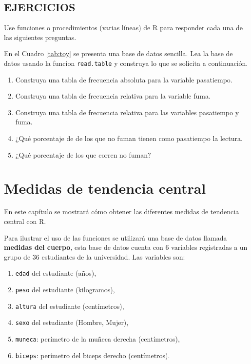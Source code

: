 \documentclass[10pt,]{krantz}
\providecommand{\tightlist}{%
  \setlength{\itemsep}{0pt}\setlength{\parskip}{0pt}}
\let\proglang=\textsf
\begin{document}
\section*{EJERCICIOS}\label{ejercicios-4}


Use funciones o procedimientos (varias líneas) de \proglang{R} para
responder cada una de las siguientes preguntas.

En el Cuadro \ref{tab:toy} se presenta una base de datos sencilla. Lea
la base de datos usando la funcion \texttt{read.table} y construya lo
que se solicita a continuación.

\begin{enumerate}
\def\labelenumi{\arabic{enumi}.}
\tightlist
\item
  Construya una tabla de frecuencia absoluta para la variable
  pasatiempo.
\item
  Construya una tabla de frecuencia relativa para la variable fuma.
\item
  Construya una tabla de frecuencia relativa para las variables
  pasatiempo y fuma.
\item
  ¿Qué porcentaje de de los que no fuman tienen como pasatiempo la
  lectura.
\item
  ¿Qué porcentaje de los que corren no fuman?
\end{enumerate}

\chapter{\texorpdfstring{Medidas de tendencia central
\label{central}}{Medidas de tendencia central }}\label{medidas-de-tendencia-central}

En este capítulo se mostrará cómo obtener las diferentes medidas de
tendencia central con \proglang{R}.

Para ilustrar el uso de las funciones se utilizará una base de datos
llamada \textbf{medidas del cuerpo}, esta base de datos cuenta con 6
variables registradas a un grupo de 36 estudiantes de la universidad.
Las variables son:

\begin{enumerate}
\def\labelenumi{\arabic{enumi}.}
\tightlist
\item
  \texttt{edad} del estudiante (años),
\item
  \texttt{peso} del estudiante (kilogramos),
\item
  \texttt{altura} del estudiante (centímetros),
\item
  \texttt{sexo} del estudiante (Hombre, Mujer),
\item
  \texttt{muneca}: perímetro de la muñeca derecha (centímetros),
\item
  \texttt{biceps}: perímetro del biceps derecho (centímetros).
\end{enumerate}
\end{document}
